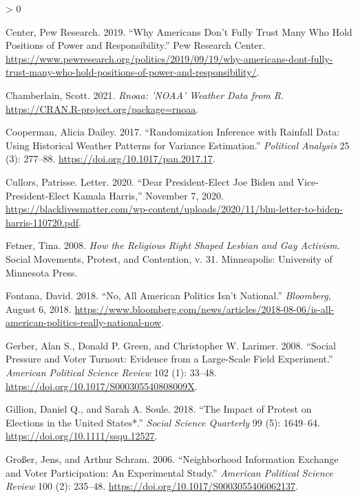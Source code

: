 \documentclass[
  12pt,
]{article}
\newlength{\cslhangindent}
\newenvironment{CSLReferences}[2] %
 {%
  \setlength{\parindent}{0pt}
  \ifodd #1 \everypar{\setlength{\hangindent}{\cslhangindent}}\ignorespaces\fi
  \ifnum #2 > 0
  \setlength{\parskip}{#2\baselineskip}
  \fi
 }%
 {}
\begin{document}
\begin{CSLReferences}{1}{0}
\leavevmode\hypertarget{ref-PewResearchCenter2019}{}%
Center, Pew Research. 2019. {``Why {Americans Don}'t {Fully Trust Many Who Hold Positions} of {Power} and {Responsibility}.''} {Pew Research Center}. \url{https://www.pewresearch.org/politics/2019/09/19/why-americans-dont-fully-trust-many-who-hold-positions-of-power-and-responsibility/}.

\leavevmode\hypertarget{ref-Chamberlain2021}{}%
Chamberlain, Scott. 2021. \emph{Rnoaa: '{NOAA}' {Weather Data} from {R}}. \url{https://CRAN.R-project.org/package=rnoaa}.

\leavevmode\hypertarget{ref-Cooperman2017}{}%
Cooperman, Alicia Dailey. 2017. {``Randomization {Inference} with {Rainfall Data}: {Using Historical Weather Patterns} for {Variance Estimation}.''} \emph{Political Analysis} 25 (3): 277--88. \url{https://doi.org/10.1017/pan.2017.17}.

\leavevmode\hypertarget{ref-Cullors2020}{}%
Cullors, Patrisse. Letter. 2020. {``Dear {President}-{Elect Joe Biden} and {Vice}-{President}-{Elect Kamala Harris},''} November 7, 2020. \url{https://blacklivesmatter.com/wp-content/uploads/2020/11/blm-letter-to-biden-harris-110720.pdf}.

\leavevmode\hypertarget{ref-Fetner2008}{}%
Fetner, Tina. 2008. \emph{How the Religious Right Shaped Lesbian and Gay Activism}. Social Movements, Protest, and Contention, v. 31. {Minneapolis}: {University of Minnesota Press}.

\leavevmode\hypertarget{ref-Fontana2018}{}%
Fontana, David. 2018. {``No, {All American Politics Isn}'t {National}.''} \emph{Bloomberg}, August 6, 2018. \url{https://www.bloomberg.com/news/articles/2018-08-06/is-all-american-politics-really-national-now}.

\leavevmode\hypertarget{ref-Gerber2008}{}%
Gerber, Alan S., Donald P. Green, and Christopher W. Larimer. 2008. {``Social {Pressure} and {Voter Turnout}: {Evidence} from a {Large}-{Scale Field Experiment}.''} \emph{American Political Science Review} 102 (1): 33--48. \url{https://doi.org/10.1017/S000305540808009X}.

\leavevmode\hypertarget{ref-Gillion2018}{}%
Gillion, Daniel Q., and Sarah A. Soule. 2018. {``The {Impact} of {Protest} on {Elections} in the {United States}*.''} \emph{Social Science Quarterly} 99 (5): 1649--64. \url{https://doi.org/10.1111/ssqu.12527}.

\leavevmode\hypertarget{ref-Grosser2006}{}%
Großer, Jens, and Arthur Schram. 2006. {``Neighborhood {Information Exchange} and {Voter Participation}: {An Experimental Study}.''} \emph{American Political Science Review} 100 (2): 235--48. \url{https://doi.org/10.1017/S0003055406062137}.


\end{CSLReferences}
\end{document}
